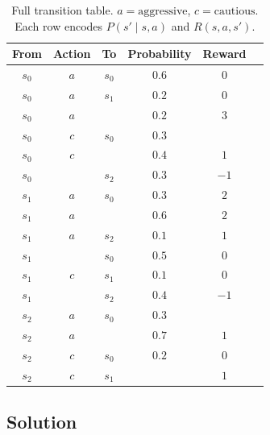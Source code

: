 \documentclass[12pt, xcolor=dvipsnames,svgnames,x11names]{article}
\begin{document}
\begin{enumerate}
\begin{table}[htpb]
\centering
\renewcommand{\arraystretch}{1.3}
\begin{tabular}{cccccc}
\hline
\textbf{From} & \textbf{Action} & \textbf{To} & \textbf{Probability} & \textbf{Reward} \\
\hline
$s_0$ & $a$ & $s_0$ & $0.6$ & $0$  \\
$s_0$ & $a$ & $s_1$ & $0.2$ & $0$  \\
$s_0$ & $a$ &  & $0.2$ & $3$  \\
$s_0$ & $c$ & $s_0$ & $0.3$ &   \\
$s_0$ & $c$ &  & $0.4$ & $1$  \\
$s_0$ &  & $s_2$ & $0.3$ & $-1$ \\
\hline
$s_1$ & $a$ & $s_0$ & $0.3$ & $2$  \\
$s_1$ & $a$ &  & $0.6$ & $2$  \\
$s_1$ & $a$ & $s_2$ & $0.1$ & $1$  \\
$s_1$ &  & $s_0$ & $0.5$ & $0$  \\
$s_1$ & $c$ & $s_1$ & $0.1$ & $0$  \\
$s_1$ &  & $s_2$ & $0.4$ & $-1$ \\
\hline
$s_2$ & $a$ & $s_0$ & $0.3$ &    \\
$s_2$ & $a$ &  & $0.7$ & $1$  \\
$s_2$ & $c$ & $s_0$ & $0.2$ & $0$  \\
$s_2$ & $c$ & $s_1$ &  & $1$  \\
\hline
\end{tabular}
\caption{Full transition table. $a = \text{aggressive}$, $c = \text{cautious}$.
         Each row encodes $P(s' \mid s, a)$ and $R(s, a, s')$.}
\label{tab:transitions}
\end{table}




\end{enumerate}


\subsection{Solution}
\end{document}

